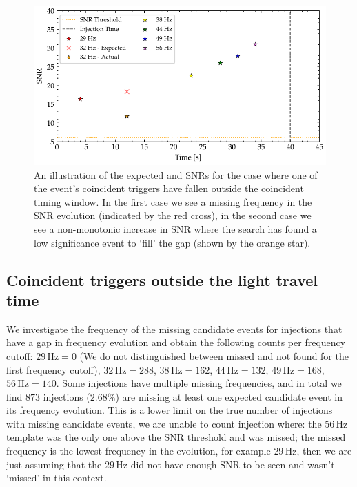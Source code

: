 \begin{figure}
       \centering
    \includegraphics[width=\textwidth]{images/6_earlywarning/identified-problems/non_mono_snr.pdf}
    \caption{An illustration of the expected and SNRs for the case where one of the event's coincident triggers have fallen outside the coincident timing window. In the first case we see a missing frequency in the SNR evolution (indicated by the red cross), in the second case we see a non-monotonic increase in SNR where the search has found a low significance event to `fill' the gap (shown by the orange star).}
    \label{6:fig:non-monotonic-snr}
\end{figure}

\subsection{\label{6:sec:light-travel-time}Coincident triggers outside the light travel time}

We investigate the frequency of the missing candidate events for injections that have a gap in frequency evolution and obtain the following counts per frequency cutoff: $29 \, \text{Hz} = 0$ (We do not distinguished between missed and not found for the first frequency cutoff), $32 \, \text{Hz} = 288$, $38 \, \text{Hz} = 162$, $44 \, \text{Hz} = 132$, $49 \, \text{Hz} = 168$, $56 \, \text{Hz} = 140$. Some injections have multiple missing frequencies, and in total we find $873$ injections ($2.68\%$) are missing at least one expected candidate event in its frequency evolution. This is a lower limit on the true number of injections with missing candidate events, we are unable to count injection where: the $56 \, \text{Hz}$ template was the only one above the SNR threshold and was missed; the missed frequency is the lowest frequency in the evolution, for example $29 \, \text{Hz}$, then we are just assuming that the $29 \, \text{Hz}$ did not have enough SNR to be seen and wasn't `missed' in this context.

